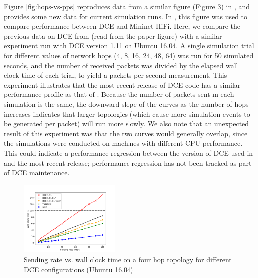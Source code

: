\documentclass{sig-alternate}
\begin{document}
Figure \ref{fig:hops-vs-pps} reproduces data from a similar figure (Figure 3)
in \cite{Tazaki13}, and provides some new data for current simulation runs.
In \cite{Tazaki13}, this figure was used to compare performance between
DCE and Mininet-HiFi.  Here, we compare the previous data on DCE from
\cite{Tazaki13} (read from the paper figure) with a similar experiment run
with DCE version 1.11 on Ubuntu 16.04.  A single simulation trial for different
values of network hops (4, 8, 16, 24, 48, 64) was run for 50 simulated
seconds, and the number of received packets was divided by the elapsed
wall clock time of each trial, to yield a packets-per-second measurement.
This experiment illustrates that the most recent release of DCE code has a
similar performance profile as that of \cite{Tazaki13}.  Because the
number of packets sent in each simulation is the same, the downward
slope of the curves as the number of hops increases indicates that larger
topologies (which cause more simulation events to be generated per packet)
will run more slowly.  We also note that an unexpected result of this
experiment was that the two curves would generally overlap, since the
simulations were conducted on machines with different CPU performance.
This could indicate a performance regression between the version of DCE
used in \cite{Tazaki13} and the most recent release; performance regression
has not been tracked as part of DCE maintenance.

\begin{figure}[h!]
  \centering
    \includegraphics[width=0.43\textwidth]{figs/rate-vs-time.png}
  \caption{Sending rate vs. wall clock time on a four hop topology for different DCE configurations (Ubuntu 16.04)}
  \label{fig:rate-vs-time}
\end{figure}
\end{document}
